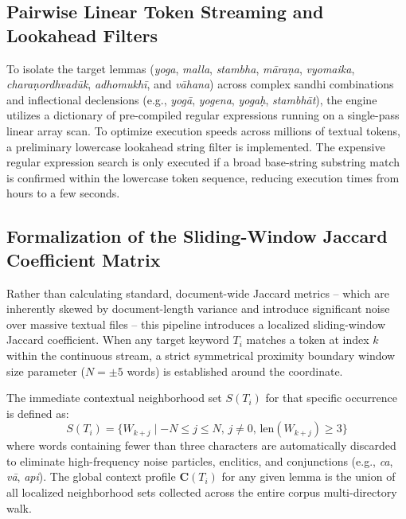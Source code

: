 \documentclass[11pt,twoside,letterpaper]{article}
\begin{document}
\subsection{Pairwise Linear Token Streaming and Lookahead Filters}
To isolate the target lemmas (\textit{yoga}, \textit{malla}, \textit{stambha}, \textit{m\={a}ra\d{n}a}, \textit{vyomaika}, \textit{chara\d{n}ordhvad\={u}k}, \textit{adhomukh\={i}}, and \textit{v\={a}hana}) across complex sandhi combinations and inflectional declensions (e.g., \textit{yog\={a}}, \textit{yogena}, \textit{yoga\d{h}}, \textit{stambh\={a}t}), the engine utilizes a dictionary of pre-compiled regular expressions running on a single-pass linear array scan. To optimize execution speeds across millions of textual tokens, a preliminary lowercase lookahead string filter is implemented. The expensive regular expression search is only executed if a broad base-string substring match is confirmed within the lowercase token sequence, reducing execution times from hours to a few seconds.

\subsection{Formalization of the Sliding-Window Jaccard Coefficient Matrix}
Rather than calculating standard, document-wide Jaccard metrics -- which are inherently skewed by document-length variance and introduce significant noise over massive textual files -- this pipeline introduces a localized sliding-window Jaccard coefficient. When any target keyword $T_i$ matches a token at index $k$ within the continuous stream, a strict symmetrical proximity boundary window size parameter ($N = \pm 5$ words) is established around the coordinate.

The immediate contextual neighborhood set $S(T_i)$ for that specific occurrence is defined as:
\begin{equation}
S(T_i) = \{W_{k+j} \mid -N \le j \le N, \, j \neq 0, \, \text{len}(W_{k+j}) \ge 3\}
\end{equation}
where words containing fewer than three characters are automatically discarded to eliminate high-frequency noise particles, enclitics, and conjunctions (e.g., \textit{ca}, \textit{v\={a}}, \textit{api}). The global context profile $\mathbf{C}(T_i)$ for any given lemma is the union of all localized neighborhood sets collected across the entire corpus multi-directory walk.
\end{document}
